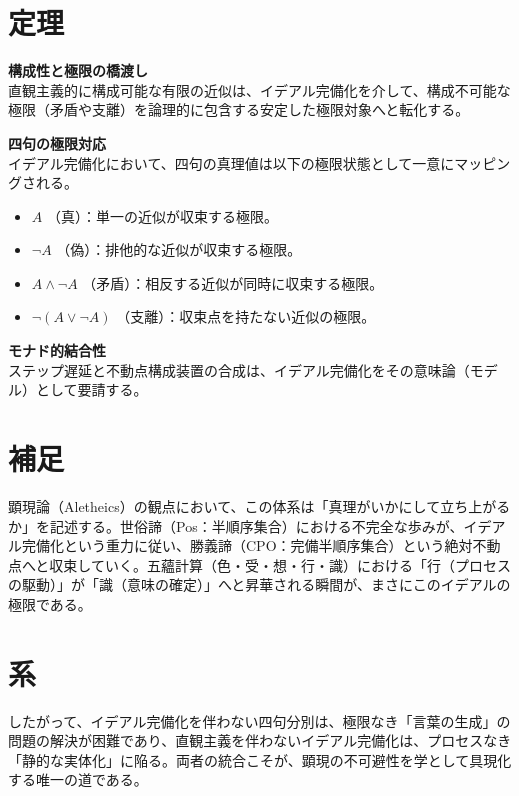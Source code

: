 \documentclass[11pt,a4paper]{article}
\begin{document}
\section{定理}

\begin{description}[style=multiline, leftmargin=4cm]
  \item[定理 3.1] \textbf{構成性と極限の橋渡し}\\
  直観主義的に構成可能な有限の近似は、イデアル完備化を介して、構成不可能な極限（矛盾や支離）を論理的に包含する安定した極限対象へと転化する。
  
  \item[定理 3.2] \textbf{四句の極限対応}\\
  イデアル完備化において、四句の真理値は以下の極限状態として一意にマッピングされる。
  \begin{itemize}
    \item $A$ （真）：単一の近似が収束する極限。
    \item $\neg A$ （偽）：排他的な近似が収束する極限。
    \item $A \wedge \neg A$ （矛盾）：相反する近似が同時に収束する極限。
    \item $\neg(A \vee \neg A)$ （支離）：収束点を持たない近似の極限。
  \end{itemize}
  
  \item[定理 3.3] \textbf{モナド的結合性}\\
  ステップ遅延と不動点構成装置の合成は、イデアル完備化をその意味論（モデル）として要請する。
\end{description}

\section{補足}
顕現論（Aletheics）の観点において、この体系は「真理がいかにして立ち上がるか」を記述する。世俗諦（Pos：半順序集合）における不完全な歩みが、イデアル完備化という重力に従い、勝義諦（CPO：完備半順序集合）という絶対不動点へと収束していく。五蘊計算（色・受・想・行・識）における「行（プロセスの駆動）」が「識（意味の確定）」へと昇華される瞬間が、まさにこのイデアルの極限である。

\section{系}
したがって、イデアル完備化を伴わない四句分別は、極限なき「言葉の生成」の問題の解決が困難であり、直観主義を伴わないイデアル完備化は、プロセスなき「静的な実体化」に陥る。両者の統合こそが、顕現の不可避性を学として具現化する唯一の道である。
\end{document}
